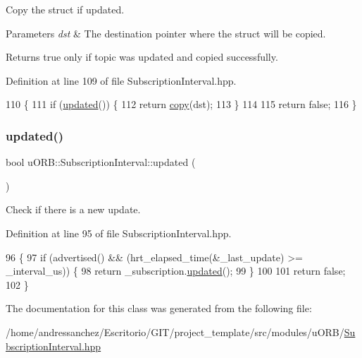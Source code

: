 Copy the struct if updated. 
\begin{DoxyParams}{Parameters}
{\em dst} & The destination pointer where the struct will be copied. \\
\hline
\end{DoxyParams}
\begin{DoxyReturn}{Returns}
true only if topic was updated and copied successfully. 
\end{DoxyReturn}


Definition at line 109 of file Subscription\+Interval.\+hpp.


\begin{DoxyCode}
110     \{
111         \textcolor{keywordflow}{if} (\hyperlink{classuORB_1_1SubscriptionInterval_aa1c12b83d65604e306b919a2c224e32e}{updated}()) \{
112             \textcolor{keywordflow}{return} \hyperlink{classuORB_1_1SubscriptionInterval_a25125ed09772665d3b4b4e6978fb3e1c}{copy}(dst);
113         \}
114 
115         \textcolor{keywordflow}{return} \textcolor{keyword}{false};
116     \}
\end{DoxyCode}
\mbox{\label{classuORB_1_1SubscriptionInterval_aa1c12b83d65604e306b919a2c224e32e}} 
\subsubsection{\texorpdfstring{updated()}{updated()}}
{\footnotesize\ttfamily bool u\+O\+R\+B\+::\+Subscription\+Interval\+::updated (\begin{DoxyParamCaption}{ }\end{DoxyParamCaption})\hspace{0.3cm}{\ttfamily [inline]}}

Check if there is a new update. 

Definition at line 95 of file Subscription\+Interval.\+hpp.


\begin{DoxyCode}
96     \{
97         \textcolor{keywordflow}{if} (advertised() && (hrt\_elapsed\_time(&\_last\_update) >= \_interval\_us)) \{
98             \textcolor{keywordflow}{return} \_subscription.\hyperlink{classuORB_1_1Subscription_a788d1848a46abe88a093be9a1f7cb2ca}{updated}();
99         \}
100 
101         \textcolor{keywordflow}{return} \textcolor{keyword}{false};
102     \}
\end{DoxyCode}


The documentation for this class was generated from the following file\+:\begin{DoxyCompactItemize}
\item 
/home/andressanchez/\+Escritorio/\+G\+I\+T/project\+\_\+template/src/modules/u\+O\+R\+B/\hyperlink{SubscriptionInterval_8hpp}{Subscription\+Interval.\+hpp}\end{DoxyCompactItemize}
